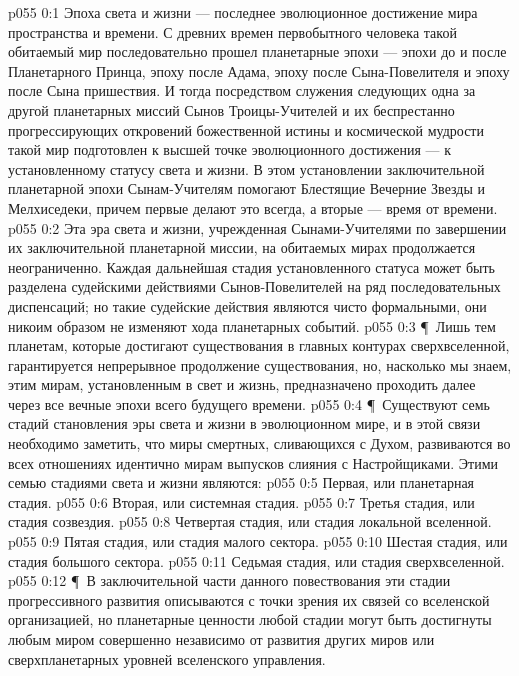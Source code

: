 \vs p055 0:1 Эпоха света и жизни --- последнее эволюционное достижение мира пространства и времени. С древних времен первобытного человека такой обитаемый мир последовательно прошел планетарные эпохи --- эпохи до и после Планетарного Принца, эпоху после Адама, эпоху после Сына\hyp{}Повелителя и эпоху после Сына пришествия. И тогда посредством служения следующих одна за другой планетарных миссий Сынов Троицы\hyp{}Учителей и их беспрестанно прогрессирующих откровений божественной истины и космической мудрости такой мир подготовлен к высшей точке эволюционного достижения --- к установленному статусу света и жизни. В этом установлении заключительной планетарной эпохи Сынам\hyp{}Учителям помогают Блестящие Вечерние Звезды и Мелхиседеки, причем первые делают это всегда, а вторые --- время от времени.
\vs p055 0:2 Эта эра света и жизни, учрежденная Сынами\hyp{}Учителями по завершении их заключительной планетарной миссии, на обитаемых мирах продолжается неограниченно. Каждая дальнейшая стадия установленного статуса может быть разделена судейскими действиями Сынов\hyp{}Повелителей на ряд последовательных диспенсаций; но такие судейские действия являются чисто формальными, они никоим образом не изменяют хода планетарных событий.
\vs p055 0:3 \P\ Лишь тем планетам, которые достигают существования в главных контурах сверхвселенной, гарантируется непрерывное продолжение существования, но, насколько мы знаем, этим мирам, установленным в свет и жизнь, предназначено проходить далее через все вечные эпохи всего будущего времени.
\vs p055 0:4 \P\ Существуют семь стадий становления эры света и жизни в эволюционном мире, и в этой связи необходимо заметить, что миры смертных, сливающихся с Духом, развиваются во всех отношениях идентично мирам выпусков слияния с Настройщиками. Этими семью стадиями света и жизни являются:
\vs p055 0:5 \bibnobreakspace Первая, или планетарная стадия.
\vs p055 0:6 \bibnobreakspace Вторая, или системная стадия.
\vs p055 0:7 \bibnobreakspace Третья стадия, или стадия созвездия.
\vs p055 0:8 \bibnobreakspace Четвертая стадия, или стадия локальной вселенной.
\vs p055 0:9 \bibnobreakspace Пятая стадия, или стадия малого сектора.
\vs p055 0:10 \bibnobreakspace Шестая стадия, или стадия большого сектора.
\vs p055 0:11 \bibnobreakspace Седьмая стадия, или стадия сверхвселенной.
\vs p055 0:12 \P\ В заключительной части данного повествования эти стадии прогрессивного развития описываются с точки зрения их связей со вселенской организацией, но планетарные ценности любой стадии могут быть достигнуты любым миром совершенно независимо от развития других миров или сверхпланетарных уровней вселенского управления.

